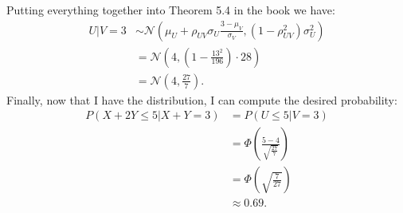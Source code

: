 \begin{problem}{38}
\begin{enumerate}
Putting everything together into Theorem 5.4 in the book we have:
\begin{align*}
U|V=3 &\sim \mathcal N \left (\mu_U +\rho_{UV}\sigma_U \frac{3-\mu_V}{\sigma_V}, (1-\rho_{UV}^2)\sigma_U^2 \right)\\
&=\mathcal N \left (4, \left(1-\frac{13^2}{196}\right)\cdot 28 \right) \\
& = \mathcal N \left (4, \frac{27}{7} \right). 
\end{align*}
Finally, now that I have the distribution, I can compute the desired probability:
\begin{align*}
P(X+2Y \le 5|X+Y=3) &= P(U \le 5|V=3) \\
& = \Phi \left (\frac{5-4}{\sqrt{\frac{27}{7}}} \right) \\
& = \Phi \left(\sqrt{\frac{7}{27}} \right) \\
& \approx 0.69.
\end{align*}

\end{enumerate}
\end{problem}





